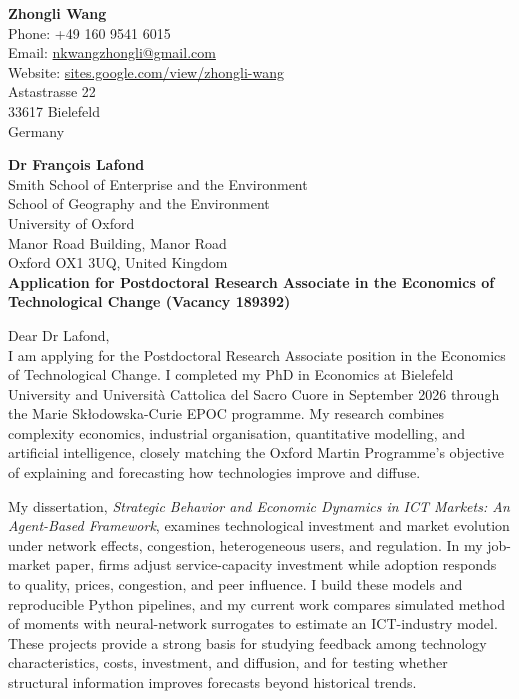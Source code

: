 \documentclass[10pt]{article}
\begin{document}
\begin{flushright}
\textbf{Zhongli Wang} \\
Phone: +49 160 9541 6015 \\
Email: \href{mailto:nkwangzhongli@gmail.com}{nkwangzhongli@gmail.com} \\
Website: \href{https://sites.google.com/view/zhongli-wang/}{sites.google.com/view/zhongli-wang} \\
Astastrasse 22 \\
33617 Bielefeld \\
Germany \\
\end{flushright}

\noindent
\textbf{Dr Fran\c{c}ois Lafond} \\
Smith School of Enterprise and the Environment \\
School of Geography and the Environment \\
University of Oxford \\
Manor Road Building, Manor Road \\
Oxford OX1 3UQ, United Kingdom \\

\noindent
\textbf{Application for Postdoctoral Research Associate in the Economics of Technological Change (Vacancy 189392)}\\

\vspace{0.25cm}

\noindent Dear Dr Lafond,\\[0.15cm]

I am applying for the Postdoctoral Research Associate position in the Economics of Technological Change. I completed my PhD in Economics at Bielefeld University and Universit\`a Cattolica del Sacro Cuore in September 2026 through the Marie Sk{\l}odowska-Curie EPOC programme. My research combines complexity economics, industrial organisation, quantitative modelling, and artificial intelligence, closely matching the Oxford Martin Programme's objective of explaining and forecasting how technologies improve and diffuse.

My dissertation, \emph{Strategic Behavior and Economic Dynamics in ICT Markets: An Agent-Based Framework}, examines technological investment and market evolution under network effects, congestion, heterogeneous users, and regulation. In my job-market paper, firms adjust service-capacity investment while adoption responds to quality, prices, congestion, and peer influence. I build these models and reproducible Python pipelines, and my current work compares simulated method of moments with neural-network surrogates to estimate an ICT-industry model. These projects provide a strong basis for studying feedback among technology characteristics, costs, investment, and diffusion, and for testing whether structural information improves forecasts beyond historical trends.
\end{document}
